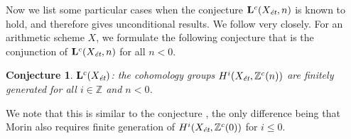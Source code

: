 \documentclass[leqno,12pt]{article}
\theoremstyle{plain}
\newtheorem{proposition}[theorem]{\indent\sc Proposition}
\newtheorem{conjecture}[theorem]{\indent\sc Conjecture}
\theoremstyle{definition}
\newcommand{\ZZ}{\mathbb{Z}}
\newcommand{\FF}{\mathbb{F}}
\newcommand{\et}{\text{\it \'{e}t}}
\begin{document}




Now we list some particular cases when the conjecture $\mathbf{L}^c (X_\et,n)$
is known to hold, and therefore gives unconditional results. We follow
\cite[\S 5]{Morin-2014} very closely. For an arithmetic scheme $X$, we formulate
the following conjecture that is the conjunction of $\mathbf{L}^c (X_\et,n)$ for
all $n < 0$.

\begin{conjecture}
  $\mathbf{L}^c (X_\et)$: the cohomology groups $H^i (X_\et, \ZZ^c (n))$ are
  finitely generated for all $i \in \ZZ$ and $n < 0$.
\end{conjecture}

We note that this is similar to the conjecture
\cite[Definition~5.8]{Morin-2014}, the only difference being that Morin also
requires finite generation of $H^i (X_\et, \ZZ^c (0))$ for $i \le 0$.
\end{document}
